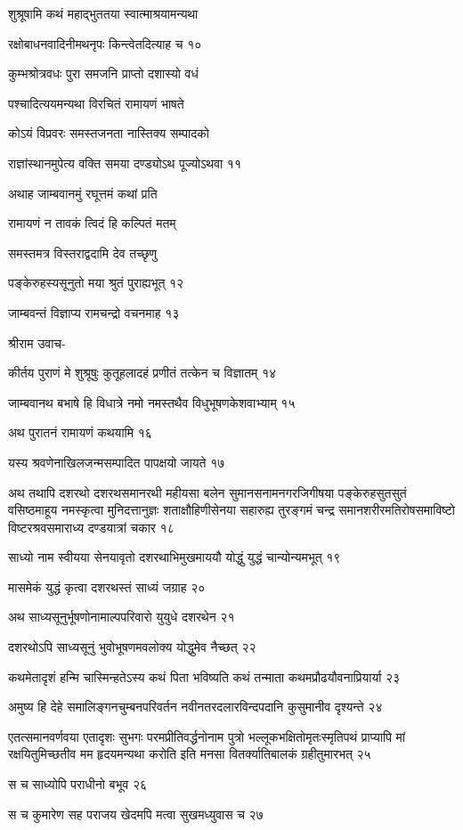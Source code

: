 शुश्रूषामि कथं महाद्भुततया स्वात्माश्रयामन्यथा

रक्षोबाधनवादिनीमथनृपः किन्त्वेतदित्याह च १०

कुम्भश्रोत्रवधः पुरा समजनि प्राप्तो दशास्यो वधं

पश्चादित्ययमन्यथा विरचितं रामायणं भाषते

कोऽयं विप्रवरः समस्तजनता नास्तिक्य सम्पादको

राज्ञांस्थानमुपेत्य वक्ति समया दण्ड्योऽथ पूज्योऽथवा ११

अथाह जाम्बवानमुं रघूत्तमं कथां प्रति

रामायणं न तावकं त्विदं हि कल्पितं मतम्

समस्तमत्र विस्तराद्वदामि देव तच्छृणु

पङ्केरुहस्यसूनुतो मया श्रुतं पुराह्यभूत् १२

जाम्बवन्तं विज्ञाप्य रामचन्द्रो वचनमाह १३

श्रीराम उवाच-

कीर्तय पुराणं मे शुश्रूषुः कुतूहलादहं प्रणीतं तत्केन च विज्ञातम् १४

जाम्बवानथ बभाषे हि विधात्रे नमो नमस्तथैव विधुभूषणकेशवाभ्याम् १५

अथ पुरातनं रामायणं कथयामि १६

यस्य श्रवणेनाखिलजन्मसम्पादित पापक्षयो जायते १७

अथ तथापि दशरथो दशरथसमानरथी महीयसा बलेन सुमानसनामनगरजिगीषया पङ्केरुहसुतसुतं
वसिष्ठमाहूय नमस्कृत्वा मुनिदत्तानुज्ञः शताक्षौहिणीसेनया सहारुह्य तुरङ्गमं चन्द्र
समानशरीरमतिरोषसमाविष्टो विष्टरश्रवसमाराध्य दण्डयात्रां चकार १८

साध्यो नाम स्वीयया सेनयावृतो दशरथाभिमुखमाययौ योद्धुं युद्धं चान्योन्यमभूत् १९

मासमेकं युद्धं कृत्वा दशरथस्तं साध्यं जग्राह २०

अथ साध्यसूनुर्भूषणोनामाल्पपरिवारो युयुधे दशरथेन २१

दशरथोऽपि साध्यसूनुं भुवोभूषणमवलोक्य योद्धुमेव नैच्छत् २२

कथमेतादृशं हन्मि चास्मिन्हतेऽस्य कथं पिता भविष्यति कथं तन्माता कथमप्रौढयौवनाप्रियार्या
 २३

अमुष्य हि देहे समालिङ्गनचुम्बनपरिवर्तन नवीनतरदलारविन्दपदानि कुसुमानीव दृश्यन्ते २४

एतत्समानवर्णवया एतादृशः सुभगः परमप्रीतिवर्द्धनोनाम पुत्रो भल्लूकभक्षितोमृतःस्मृतिपथं
प्राप्यापि मां रक्षयितुमिच्छतीव मम हृदयमन्यथा करोति इति मनसा वितर्क्यातिबालकं
ग्रहीतुमारभत् २५

स च साध्योपि पराधीनो बभूव २६

स च कुमारेण सह पराजय खेदमपि मत्वा सुखमध्युवास च २७

